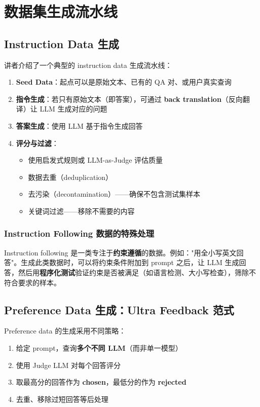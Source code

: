 \section{数据集生成流水线}

\subsection{Instruction Data 生成}

讲者介绍了一个典型的 instruction data 生成流水线：

\begin{enumerate}
    \item \textbf{Seed Data}：起点可以是原始文本、已有的 QA 对、或用户真实查询
    \item \textbf{指令生成}：若只有原始文本（即答案），可通过 \textbf{back translation}（反向翻译）让 LLM 生成对应的问题
    \item \textbf{答案生成}：使用 LLM 基于指令生成回答
    \item \textbf{评分与过滤}：
    \begin{itemize}
        \item 使用启发式规则或 LLM-as-Judge 评估质量
        \item 数据去重（deduplication）
        \item 去污染（decontamination）——确保不包含测试集样本
        \item 关键词过滤——移除不需要的内容
    \end{itemize}
\end{enumerate}

\subsubsection{Instruction Following 数据的特殊处理}

Instruction following 是一类专注于\textbf{约束遵循}的数据。例如："用全小写英文回答"。生成此类数据时，可以将约束条件附加到 prompt 之后，让 LLM 生成回答，然后用\textbf{程序化测试}验证约束是否被满足（如语言检测、大小写检查），筛除不符合要求的样本。

\subsection{Preference Data 生成：Ultra Feedback 范式}

Preference data 的生成采用不同策略：

\begin{enumerate}
    \item 给定 prompt，查询\textbf{多个不同 LLM}（而非单一模型）
    \item 使用 Judge LLM 对每个回答评分
    \item 取最高分的回答作为 \textbf{chosen}，最低分的作为 \textbf{rejected}
    \item 去重、移除过短回答等后处理
\end{enumerate}

